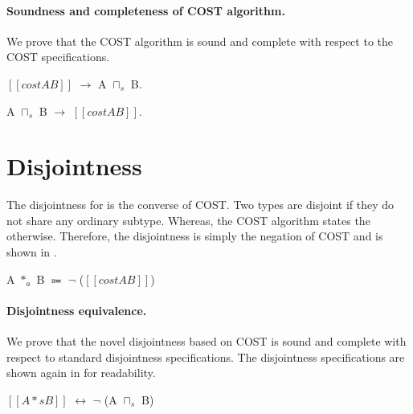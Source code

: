 \paragraph{Soundness and completeness of COST algorithm.}
We prove that the COST algorithm is sound and complete with
respect to the COST specifications.

\begin{lemma}
  $[[cost A B]]$ $\rightarrow$ A $\sqcap_s$ B.
\label{lemma:cost:sound}
\end{lemma}

\begin{lemma}
  A $\sqcap_s$ B $\rightarrow$ $[[cost A B]]$.
\label{lemma:cost:complete}
\end{lemma}


\section{Disjointness}

The disjointness for \name is the converse of COST.
Two types are disjoint if they do not share any ordinary subtype.
Whereas, the COST algorithm states the otherwise.
Therefore, the disjointness is simply the negation of COST and
is shown in .

\begin{definition}
\label{cost:disj:def}
    A $*_a$ B $\Coloneqq$ $\neg$ ($[[cost A B]]$) \\
\end{definition}


\paragraph{Disjointness equivalence.}
We prove that the novel disjointness based on
COST is sound and complete with respect to standard disjointness
specifications. The disjointness specifications are shown again 
in  for readability.

\begin{definition}[$[[/\]]$-Disjointness]
\label{def:cost:disj}
  $[[A *s B]]$ $\Coloneqq$ $\nexists$ C, $[[ordinary C]]$ and $[[C <: A]]$ and $[[C <: B]]$.
\end{definition}

\begin{lemma}
  $[[A *s B]]$ $\leftrightarrow$ $\neg$ (A $\sqcap_s$ B)
\label{lemma:cost:disj:sound}
\end{lemma}


